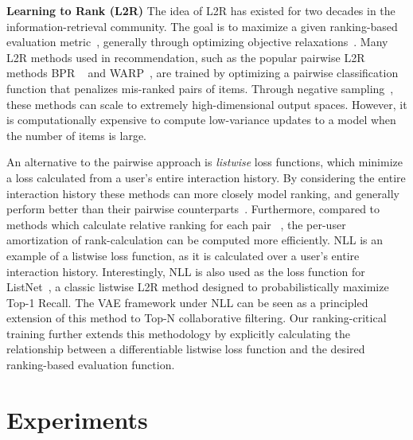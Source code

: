 \documentclass{article} \usepackage{iclr2020_conference,times}
\begin{document}
{\bf Learning to Rank (L2R)} The idea of L2R has existed for two decades in the information-retrieval community. The goal is to maximize a given ranking-based evaluation metric~\citep{liu2009learning,li2014learning}, generally through optimizing objective relaxations~\citep{weimer2008cofi}. 
Many L2R methods used in recommendation, such as the popular pairwise L2R methods BPR ~\citep{rendle2009bpr} and WARP~\citep{weston2011wsabie}, are trained by optimizing a pairwise classification function that penalizes mis-ranked pairs of items. Through negative sampling~\citep{hu2008collaborative}, these methods can scale to extremely high-dimensional output spaces. However, it is computationally expensive to compute low-variance updates to a model when the number of items is large.

An alternative to the pairwise approach is \textit{listwise} loss functions, which minimize a loss calculated from a user's entire interaction history. By considering the entire interaction history these methods can more closely model ranking, and generally perform better than their pairwise counterparts~\citep{xia2008listmle}.
Furthermore, compared to methods which calculate relative ranking for each pair ~\citep{weston2011wsabie}, the per-user amortization of rank-calculation can be computed more efficiently.
NLL is an example of a listwise loss function, as it is calculated over a user's entire interaction history. Interestingly, NLL is also used as the loss function for ListNet~\citep{cao2007listnet}, a classic listwise L2R method designed to probabilistically maximize Top-1 Recall. The VAE framework under NLL can be seen as a principled extension of this method to Top-N collaborative filtering. Our ranking-critical training further extends this methodology by explicitly calculating the relationship between a differentiable listwise loss function and the desired ranking-based evaluation function.









\vspace{-2mm}
\section{Experiments}
\vspace{-2mm}
\end{document}

